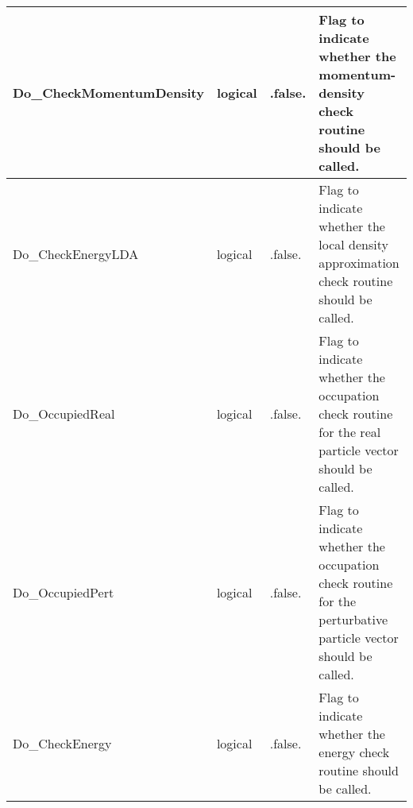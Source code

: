 \documentclass{article}
\begin{document}
\begin{longtable}{llll}
\midrule
Do\_CheckMomentumDensity & \begin{minipage}[t]{2cm}logical\end{minipage} & \begin{minipage}[t]{2cm}.false.\end{minipage} & \begin{minipage}[t]{12cm}Flag to indicate whether the momentum-density check routine should be called.\end{minipage}\\*
\midrule
Do\_CheckEnergyLDA & \begin{minipage}[t]{2cm}logical\end{minipage} & \begin{minipage}[t]{2cm}.false.\end{minipage} & \begin{minipage}[t]{12cm}Flag to indicate whether the local density approximation check routine should be called.\end{minipage}\\*
\midrule
Do\_OccupiedReal & \begin{minipage}[t]{2cm}logical\end{minipage} & \begin{minipage}[t]{2cm}.false.\end{minipage} & \begin{minipage}[t]{12cm}Flag to indicate whether the occupation check routine for the real particle vector should be called.\end{minipage}\\*
\midrule
Do\_OccupiedPert & \begin{minipage}[t]{2cm}logical\end{minipage} & \begin{minipage}[t]{2cm}.false.\end{minipage} & \begin{minipage}[t]{12cm}Flag to indicate whether the occupation check routine for the perturbative particle vector should be called.\end{minipage}\\*
\midrule
Do\_CheckEnergy & \begin{minipage}[t]{2cm}logical\end{minipage} & \begin{minipage}[t]{2cm}.false.\end{minipage} & \begin{minipage}[t]{12cm}Flag to indicate whether the energy check routine should be called.\end{minipage}\\*

\end{longtable}
\end{document}
